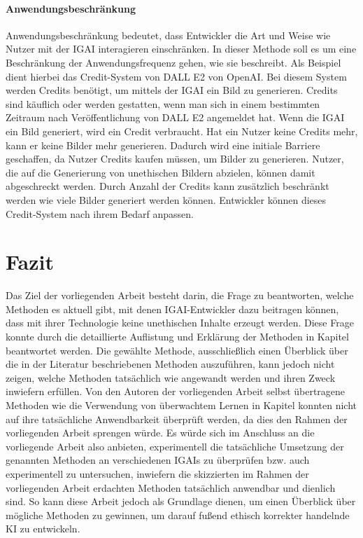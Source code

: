 \documentclass[12pt]{report}
\begin{document}
\subsubsection{Anwendungsbeschränkung} %
Anwendungsbeschränkung bedeutet, dass Entwickler die Art und Weise wie Nutzer mit der \ac{IGAI} interagieren einschränken. In dieser Methode soll es um eine Beschränkung der Anwendungsfrequenz gehen, wie sie \cite{Jang} beschreibt. Als Beispiel dient hierbei das Credit-System von DALL E2 von OpenAI. Bei diesem System werden Credits benötigt, um mittels der \ac{IGAI} ein Bild zu generieren. Credits sind käuflich oder werden gestatten, wenn man sich in einem bestimmten Zeitraum nach Veröffentlichung von DALL E2 angemeldet hat. Wenn die \ac{IGAI} ein Bild generiert, wird ein Credit verbraucht. Hat ein Nutzer keine Credits mehr, kann er keine Bilder mehr generieren. Dadurch wird eine initiale Barriere geschaffen, da Nutzer Credits kaufen müssen, um Bilder zu generieren. Nutzer, die auf die Generierung von unethischen Bildern abzielen, können damit abgeschreckt werden. Durch Anzahl der Credits kann zusätzlich beschränkt werden wie viele Bilder generiert werden können. Entwickler können dieses Credit-System nach ihrem Bedarf anpassen.


\chapter{Fazit}
Das Ziel der vorliegenden Arbeit besteht darin, die Frage zu beantworten, welche Methoden es aktuell gibt, mit denen \ac{IGAI}-Entwickler dazu beitragen können, dass mit ihrer Technologie keine unethischen Inhalte erzeugt werden. Diese Frage konnte durch die detaillierte Auflistung und Erklärung der Methoden in Kapitel  beantwortet werden. Die gewählte Methode, ausschließlich einen Überblick über die in der Literatur beschriebenen Methoden auszuführen, kann jedoch nicht zeigen, welche Methoden tatsächlich wie angewandt werden und ihren Zweck inwiefern erfüllen. Von den Autoren der vorliegenden Arbeit selbst übertragene Methoden wie die Verwendung von überwachtem Lernen in Kapitel  konnten nicht auf ihre tatsächliche Anwendbarkeit überprüft werden, da dies den Rahmen der vorliegenden Arbeit sprengen würde. Es würde sich im Anschluss an die vorliegende Arbeit also anbieten, experimentell die tatsächliche Umsetzung der genannten Methoden an verschiedenen \ac{IGAI}s zu überprüfen bzw. auch experimentell zu untersuchen, inwiefern die skizzierten im Rahmen der vorliegenden Arbeit erdachten Methoden tatsächlich anwendbar und dienlich sind.
So kann diese Arbeit jedoch als Grundlage dienen, um einen Überblick über mögliche Methoden zu gewinnen, um darauf fußend ethisch korrekter handelnde \ac{KI} zu entwickeln.
\end{document}
